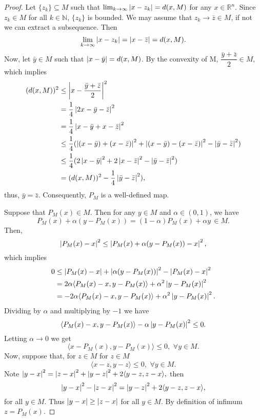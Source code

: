 \begin{proof}
    Let $\{z_k\} \subseteq M$ such that $\lim_{k \to \infty}\left\lvert x - z_k\right\rvert = d(x,M)$
    for any $x \in \mathbb{R}^{n}$. Since $z_k \in M$ for all $k \in \mathbb{N}$,
    $\{z_k\}$ is bounded. We may assume that $z_k \to \bar{z} \in M$, if not we 
    can extract a subsequence. Then
    $$
        \lim_{k\to\infty}\left\lvert x - z_k\right\rvert = \left\lvert x - \bar{z}\right\rvert = d(x,M).
    $$
    Now, let $\bar{y} \in M$ such that $\left\lvert x - \bar{y}\right\rvert = d(x,M)$. By the 
    convexity of M, $\dfrac{\bar{y} + \bar{z}}{2} \in M$, which implies 
    \begin{align*}
        (d(x,M))^2 &\leq \abs{x - \dfrac{\bar{y} + \bar{z}}{2}}^2 \\
            &= \frac{1}{4}\abs{2x - \bar{y} - \bar{z}}^2 \\
            &= \frac{1}{4}\abs{x - \bar{y} + x - \bar{z}}^2 \\
            &\leq \frac{1}{4}(\abs{(x - \bar{y}) + (x - \bar{z})}^2 + %
            \abs{(x - \bar{y}) - (x - \bar{z})}^2 - \abs{\bar{y} - \bar{z}}^2) \\
            &\leq \frac{1}{4}(2\abs{x - \bar{y}}^2 + 2\abs{x - \bar{z}}^2 - %
                \abs{\bar{y} - \bar{z}}^2) \\
            &= (d(x,M))^2 - \dfrac{1}{4}\abs{\bar{y} - \bar{z}}^2),
    \end{align*}
    thus, $\bar{y} = \bar{z}$. Consequently, $P_M$ is a well-defined map.

    Suppose that $P_M(x) \in M$. Then for any $y \in M$ and $\alpha \in (0,1)$,
    we have
    $$
        P_M(x) + \alpha(y - P_M(x)) = (1-\alpha)P_M(x) + \alpha y \, \in M.
    $$
    Then,
    $$
        \left\lvert P_M(x) - x\right\rvert^2 \leq \left\lvert P_M(x) + \alpha (y-P_M(x)) - x\right\rvert^2,
    $$
    which implies
    \begin{align*}
        0 &\leq \left\lvert P_M(x) - x\right\rvert + \left\lvert\alpha(y - P_M(x))\right\rvert^2 - \left\lvert P_M(x) - x\right\rvert^2 \\
        &= 2\alpha \langle P_M(x) - x, y - P_M(x)\rangle + \alpha^2\left\lvert y-P_M(x)\right\rvert^2 \\
        &= -2\alpha \langle P_M(x) - x, y - P_M(x)\rangle + \alpha^2\left\lvert y-P_M(x)\right\rvert^2.
    \end{align*}
    Dividing by $\alpha$ and multiplying by $-1$ we have
    $$
        \langle P_M(x) - x, y - P_M(x)\rangle - \alpha \left\lvert y-P_M(x)\right\rvert^2 \leq 0.
    $$
    Letting $\alpha \to 0$ we get
    \begin{equation}\label{prdless0}
        \langle x- P_M(x), y-P_M(x)\rangle \leq 0, \, \, \forall y \in M.
    \end{equation}
    Now, suppose that, for $z \in M$ for $z\in M$
    $$
        \langle x-z, y-z \rangle \leq 0, \, \, \forall y \in M.
    $$
    Note
    $
        \left\lvert y-x\right\rvert^2 = \left\lvert z-x\right\rvert^2 + \left\lvert y-z\right\rvert^2 + 2\langle y-z, z-x \rangle,
    $
    then
    $$
         \left\lvert y-x\right\rvert^2 - \left\lvert z-x\right\rvert^2 = \left\lvert y-z\right\rvert^2 + 2\langle y-z, z-x \rangle,
    $$
    for all $y \in M$. Thus $\left\lvert y-x\right\rvert \geq \left\lvert z-x\right\rvert$ for all $y \in M$. By
    definition of infimum $z = P_M(x)$.
    

\end{proof}
